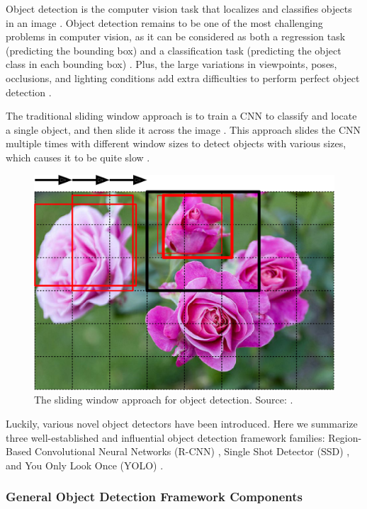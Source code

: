 \documentclass[a4paper, 11pt, oneside]{article}
\begin{document}
\label{sec:objectdetection}

Object detection is the computer vision task that localizes and classifies objects in an image
\cite{elgendy2020deep, zhao2019object, liu2020deep, geron2019hands}. Object detection remains to be one of the most
challenging problems in computer vision, as it can be considered as both a regression task (predicting the bounding box)
and a classification task (predicting the object class in each bounding box)
\cite{elgendy2020deep, girshick2014rich, geron2019hands}. Plus, the large variations in viewpoints, poses, occlusions,
and lighting conditions add extra difficulties to perform perfect object detection \cite{zhao2019object, liu2020deep}.

The traditional sliding window approach is to train a CNN to classify and locate a single object, and then slide it
across the image \cite{geron2019hands, pasquet2017amphora, girshick2014rich, redmon2016you}. This approach slides the
CNN multiple times with different window sizes to detect objects with various sizes, which causes it to be quite slow
\cite{geron2019hands}.

\begin{figure}[ht]
  \begin{center}
    \includegraphics[width=.5\textwidth]{sliding_window.png}
  \end{center}
  \caption{The sliding window approach for object detection. Source: \cite{o2019deep}.}
\end{figure}

Luckily, various novel object detectors have been introduced. Here we summarize three well-established and influential
object detection framework families: Region-Based Convolutional Neural Networks (R-CNN)
\cite{girshick2014rich, girshick2015fast, ren2015faster}, Single Shot Detector (SSD) \cite{liu2016ssd}, and You Only
Look Once (YOLO) \cite{redmon2016you, redmon2017yolo9000, redmon2018yolov3, bochkovskiy2020yolov4, yolov5}.

\subsubsection{General Object Detection Framework Components}
\end{document}
